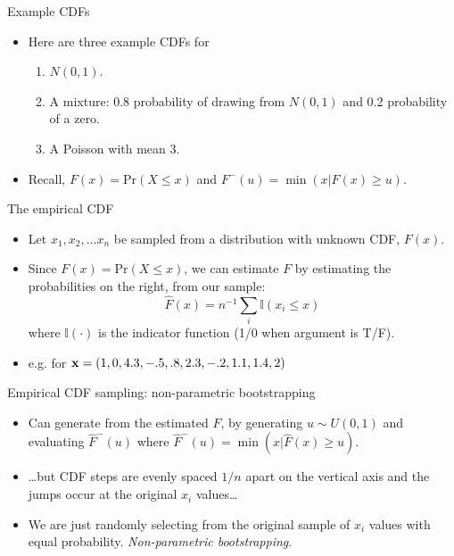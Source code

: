 \documentclass{beamer}
\newcommand{\eps}[3]
{{\begin{center}
 \rotatebox{#1}{\scalebox{#2}{\texttt{[image: \#3]}}}
 \end{center}}
}
\begin{document}
\begin{frame}{Example CDFs}
\begin{itemize}
\item Here are three example CDFs for
\begin{enumerate} 
\item $N(0,1)$.
\item A mixture: 0.8 probability of drawing from $N(0,1)$ and 0.2 probability of a zero.
\item A Poisson with mean 3. 
\end{enumerate}

\eps{-90}{.35}{cdf.eps}
\item Recall, $F(x) = \text{Pr}(X \le x)$ and $F^-(u) = \min(x|F(x) \ge u)$.
\end{itemize}

\end{frame}

\begin{frame}{The empirical CDF}
\begin{itemize}
\item Let $x_1, x_2, \ldots x_n$ be sampled from a distribution with unknown CDF, $F(x)$.
\item Since $F(x) = \text{Pr}(X \le x)$, we can estimate $F$ by estimating the probabilities on the right, from our sample:
$$
\hat F(x) = n^{-1} \sum_i \mathbb{I}(x_i\le x)
$$
where $\mathbb{I}(\cdot)$ is the indicator function (1/0 when argument is T/F).
\item e.g. for  ${\bf x} = (1, 0, 4.3, -.5, .8, 2.3, -.2, 1.1, 1.4, 2)$  
\end{itemize}
\vspace*{-.7cm}
\eps{-90}{.3}{ecdf.eps}
\end{frame}

\begin{frame}{Empirical CDF sampling: non-parametric bootstrapping}
\begin{itemize}
\item Can generate from the estimated $F$, by generating $u \sim U(0,1)$ and evaluating $\hat F^-(u)$ where $\hat F^-(u) = \min(x|\hat F(x) \ge u)$.
 \eps{-90}{.3}{ecdf.eps}
\item \ldots but CDF steps are evenly spaced $1/n$ apart on the vertical axis and the jumps occur at the original $x_i$ values\ldots
\item We are just randomly selecting from the original sample of $x_i$ values with equal probability. {\em Non-parametric bootstrapping}.
\end{itemize}
\end{frame}
\end{document}
